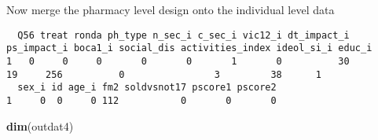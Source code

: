 \documentclass[11pt,]{article}
\newenvironment{Shaded}{\begin{snugshade}}{\end{snugshade}}
\newcommand{\CommentTok}[1]{\textcolor[rgb]{0.56,0.35,0.01}{\textit{#1}}}
\newcommand{\DecValTok}[1]{\textcolor[rgb]{0.00,0.00,0.81}{#1}}
\newcommand{\KeywordTok}[1]{\textcolor[rgb]{0.13,0.29,0.53}{\textbf{#1}}}
\newcommand{\NormalTok}[1]{#1}
\newcommand{\OperatorTok}[1]{\textcolor[rgb]{0.81,0.36,0.00}{\textbf{#1}}}
\newcommand{\StringTok}[1]{\textcolor[rgb]{0.31,0.60,0.02}{#1}}
\begin{document}
\normalsize

Now merge the pharmacy level design onto the individual level data

\scriptsize

\begin{Shaded}
\end{Shaded}

\begin{verbatim}
  Q56 treat ronda ph_type n_sec_i c_sec_i vic12_i dt_impact_i ps_impact_i boca1_i social_dis activities_index ideol_si_i educ_i
1   0     0     0       0       0       1       0          30          19     256          0                3         38      1
  sex_i id age_i fm2 soldvsnot17 pscore1 pscore2
1     0  0     0 112           0       0       0
\end{verbatim}

\begin{Shaded}
\begin{Highlighting}[]
\KeywordTok{dim}\NormalTok{(outdat4)}
\end{Highlighting}
\end{Shaded}
\end{document}
